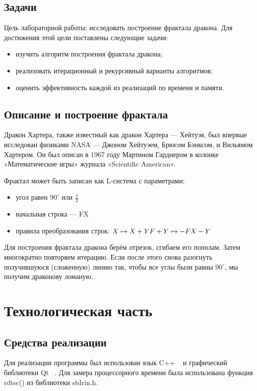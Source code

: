 \documentclass[12pt, a4paper]{report}
\begin{document}
	\section{Задачи}
	Цель лабораторной работы: исследовать построение фрактала дракона. Для достижения этой цели поставлены следующие задачи: 
	\begin{itemize}
		\item изучить алгоритм построения фрактала дракона;
		\item реализовать итерационный и рекурсивный варианты алгоритмов;
		\item оценить эффективность каждой из реализаций по времени и памяти.
	\end{itemize}

	\section{Описание и построение фрактала}
	Дракон Хартера, также известный как дракон Хартера — Хейтуэя, был впервые исследован физиками NASA — Джоном Хейтуэем, Брюсом Бэнксом, и Вильямом Хартером. Он был описан в 1967 году Мартином Гарднером в колонке «Математические игры» журнала «Scientific American».
	
	Фрактал может быть записан как L-система с параметрами:
	\begin{itemize}
		\item угол равен $90^\circ$ или $\frac{\pi}{2}$
		\item начальная строка — FX
		\item правила преобразования строк:
		$\\
			X \mapsto  X+YF+ \\
			Y \mapsto  -FX-Y
		$
	\end{itemize}

	Для построения фрактала дракона берём отрезок, сгибаем его пополам. Затем многократно повторяем итерацию. Если после этого снова разогнуть получившуюся (сложенную) линию так, чтобы все углы были равны  $90^\circ$, мы получим драконову ломаную. ~\cite{drag}

	\chapter{Технологическая часть}
	\section{Средства реализации}
	Для реализации программы был использован язык C++ ~\cite{CPP} и графический библиотеки Qt ~\cite{QT}. Для замера процессорного времени была использована функция rdtsc() из библиотеки stdrin.h.
\end{document}
